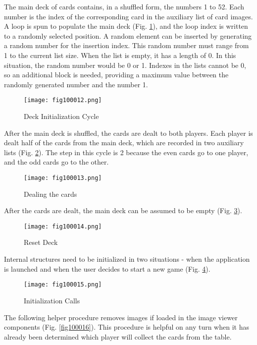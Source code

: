 The main deck of cards contains, in a shuffled form, the numbers 1 to 52. Each number is the index of the corresponding card in the auxiliary list of card images. A loop is spun to populate the main deck (Fig. \ref{fig100012}), and the loop index is written to a randomly selected position. A random element can be inserted by generating a random number for the insertion index. This random number must range from 1 to the current list size. When the list is empty, it has a length of 0. In this situation, the random number would be 0 or 1. Indexes in the lists cannot be 0, so an additional block is needed, providing a maximum value between the randomly generated number and the number 1.

\begin{figure}[H]
   \centering
   \texttt{[image: fig100012.png]}
   \caption{Deck Initialization Cycle}
\label{fig100012}
\end{figure}

After the main deck is shuffled, the cards are dealt to both players. Each player is dealt half of the cards from the main deck, which are recorded in two auxiliary lists (Fig. \ref{fig100013}). The step in this cycle is 2 because the even cards go to one player, and the odd cards go to the other.

\begin{figure}[H]
   \centering
   \texttt{[image: fig100013.png]}
   \caption{Dealing the cards}
\label{fig100013}
\end{figure}

After the cards are dealt, the main deck can be assumed to be empty (Fig. \ref{fig100014}).

\begin{figure}[H]
   \centering
   \texttt{[image: fig100014.png]}
   \caption{Reset Deck}
\label{fig100014}
\end{figure}

Internal structures need to be initialized in two situations - when the application is launched and when the user decides to start a new game (Fig. \ref{fig100015}).

\begin{figure}[H]
   \centering
   \texttt{[image: fig100015.png]}
   \caption{Initialization Calls}
\label{fig100015}
\end{figure}

The following helper procedure removes images if loaded in the image viewer components (Fig. \ref{fig100016}). This procedure is helpful on any turn when it has already been determined which player will collect the cards from the table.

